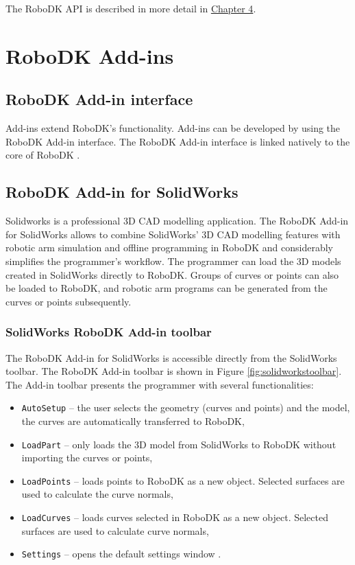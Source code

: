 The RoboDK API is described in more detail in \hyperref[chap:implementation]{Chapter 4}.

\section{RoboDK Add-ins}

\subsection{RoboDK Add-in interface}

Add-ins extend RoboDK's functionality. Add-ins can be developed by using the RoboDK Add-in interface. The RoboDK Add-in interface is linked natively to the core of RoboDK \cite{robodkaddininterface}.

\subsection{RoboDK Add-in for SolidWorks}

Solidworks is a professional 3D CAD modelling application. The RoboDK Add-in for SolidWorks allows to combine SolidWorks' 3D CAD modelling features with robotic arm simulation and offline programming in RoboDK and considerably simplifies the programmer's workflow. The programmer can load the 3D models created in SolidWorks directly to RoboDK. Groups of curves or points can also be loaded to RoboDK, and robotic arm programs can be generated from the curves or points subsequently.

\subsubsection*{SolidWorks RoboDK Add-in toolbar}

The RoboDK Add-in for SolidWorks is accessible directly from the SolidWorks toolbar.  The RoboDK Add-in toolbar is shown in Figure  \ref{fig:solidworkstoolbar}. The Add-in toolbar presents the programmer with several functionalities:

\begin{itemize}
    \item \texttt{AutoSetup} -- the user selects the geometry (curves and points) and the model, the curves are automatically transferred to RoboDK,
    \item \texttt{LoadPart} -- only loads the 3D model from SolidWorks to RoboDK without importing the curves or points,
    \item \texttt{LoadPoints} -- loads points to RoboDK as a new object. Selected surfaces are used to calculate the curve normals, 
    \item \texttt{LoadCurves} --  loads curves selected in RoboDK as a new object. Selected surfaces are used to calculate curve normals, 
    \item \texttt{Settings} -- opens the default settings window \cite{robodksolidworks}.
\end{itemize}

